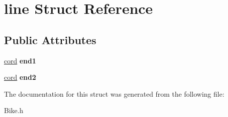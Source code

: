\hypertarget{structline}{\section{line Struct Reference}
\label{structline}
}
\subsection*{Public Attributes}
\begin{DoxyCompactItemize}
\item 
\hypertarget{structline_ae28042e22c7c5def6c4d622cd3b143b5}{\hyperlink{classcord}{cord} {\bfseries end1}}\label{structline_ae28042e22c7c5def6c4d622cd3b143b5}

\item 
\hypertarget{structline_a235a86b77d209ea41c93f8d17ef1ac2c}{\hyperlink{classcord}{cord} {\bfseries end2}}\label{structline_a235a86b77d209ea41c93f8d17ef1ac2c}

\end{DoxyCompactItemize}


The documentation for this struct was generated from the following file\-:\begin{DoxyCompactItemize}
\item 
Bike.\-h\end{DoxyCompactItemize}
